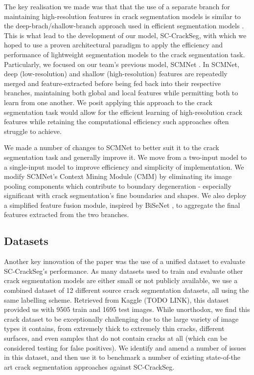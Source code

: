 \documentclass[a4paper,12pt]{report}
\begin{document}
The key realisation we made was that that the use of a separate branch for maintaining high-resolution features in crack segmentation models \cite{nayyeri_multi-resolution_2021} is similar to the deep-brach/shallow-branch approach used in efficient segmentation models \cite{yu_bisenet_2018} \cite{poudel_contextnet_2018}. This is what lead to the development of our model, SC-CrackSeg, with which we hoped to use a proven architectural paradigm to apply the efficiency and performance of lightweight segmentation models to the crack segmentation task. Particularly, we focused on our team's previous model, SCMNet \cite{singha_scmnet_2021}. In SCMNet, deep (low-resolution) and shallow (high-resolution) features are repeatedly merged and feature-extracted before being fed back into their respective branches, maintaining both global and local features while permitting both to learn from one another. We posit applying this approach to the crack segmentation task would allow for the efficient learning of high-resolution crack features while retaining the computational efficiency such approaches often struggle to achieve.

We made a number of changes to SCMNet to better suit it to the crack segmentation task and generally improve it. We move from a two-input model to a single-input model to improve efficiency and simplicity of implementation. We modify SCMNet's Context Mining Module (CMM) by eliminating its image pooling components which contribute to boundary degeneration - especially significant with crack segmentation's fine boundaries and shapes. We also deploy a simplified feature fusion module, inspired by BiSeNet \cite{yu_bisenet_2018}, to aggregate the final features extracted from the two branches. %

\subsection{Datasets}
Another key innovation of the paper was the use of a unified dataset to evaluate SC-CrackSeg's performance. As many datasets used to train and evaluate other crack segmentation models are either small or not publicly available, we use a combined dataset of 12 different source crack segmentation datasets, all using the same labelling scheme. Retrieved from Kaggle (TODO LINK), this dataset provided us with 9505 train and 1695 test images. While unorthodox, we find this crack dataset to be exceptionally challenging due to the large variety of image types it contains, from extremely thick to extremely thin cracks, different surfaces, and even samples that do not contain cracks at all (which can be considered testing for false positives). We identify and amend a number of issues in this dataset, and then use it to benchmark a number of existing state-of-the art crack segmentation approaches against SC-CrackSeg.
\end{document}
